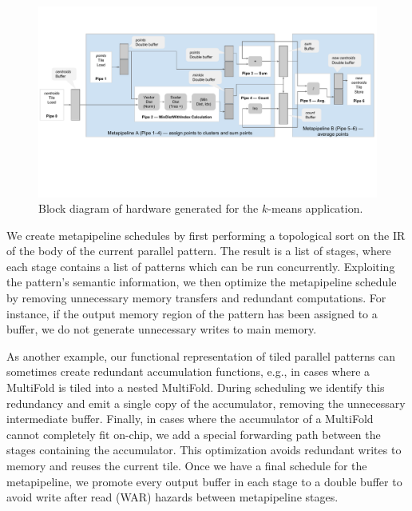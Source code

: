 

\begin{figure}
\centering
\includegraphics[width=6in]{3-delite/figs/kmeans-blockdiagram.pdf}
\caption{Block diagram of hardware generated for the $k$-means application.}
\label{fig:metapipelining}
\end{figure}

We create metapipeline schedules by first performing a topological sort on the IR of the body of the current parallel pattern.
The result is a list of stages, where each stage contains a list of patterns which can be run concurrently.
Exploiting the pattern's semantic information, we then
optimize the metapipeline schedule by removing unnecessary memory transfers and redundant computations.
For instance, if the output memory region of the pattern has been assigned to a buffer,
we do not generate unnecessary writes to main memory.

As another example, our functional representation of tiled parallel patterns can sometimes create redundant accumulation functions,
e.g., in cases where a MultiFold is tiled into a nested MultiFold. During scheduling we identify
this redundancy and emit a single copy of the accumulator, removing the unnecessary intermediate buffer.
Finally, in cases where the accumulator of a MultiFold cannot completely fit on-chip, we add a special
forwarding path between the stages containing the accumulator. This optimization avoids redundant writes to memory and
reuses the current tile.
Once we have a final schedule for the metapipeline, we promote every output buffer in each stage
to a double buffer to avoid write after read (WAR) hazards between metapipeline stages.


